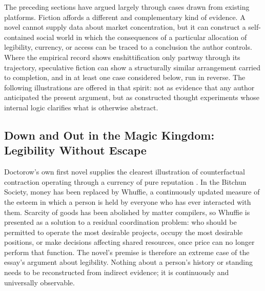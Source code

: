 \documentclass[11pt]{article}
\begin{document}
The preceding sections have argued largely through cases drawn from existing platforms. Fiction affords a different and complementary kind of evidence. A novel cannot supply data about market concentration, but it can construct a self-contained social world in which the consequences of a particular allocation of legibility, currency, or access can be traced to a conclusion the author controls. Where the empirical record shows enshittification only partway through its trajectory, speculative fiction can show a structurally similar arrangement carried to completion, and in at least one case considered below, run in reverse. The following illustrations are offered in that spirit: not as evidence that any author anticipated the present argument, but as constructed thought experiments whose internal logic clarifies what is otherwise abstract.

\subsection{Down and Out in the Magic Kingdom: Legibility Without Escape}

Doctorow's own first novel supplies the clearest illustration of counterfactual contraction operating through a currency of pure reputation \citep{doctorow2003magickingdom}. In the Bitchun Society, money has been replaced by Whuffie, a continuously updated measure of the esteem in which a person is held by everyone who has ever interacted with them. Scarcity of goods has been abolished by matter compilers, so Whuffie is presented as a solution to a residual coordination problem: who should be permitted to operate the most desirable projects, occupy the most desirable positions, or make decisions affecting shared resources, once price can no longer perform that function. The novel's premise is therefore an extreme case of the essay's argument about legibility. Nothing about a person's history or standing needs to be reconstructed from indirect evidence; it is continuously and universally observable.
\end{document}
